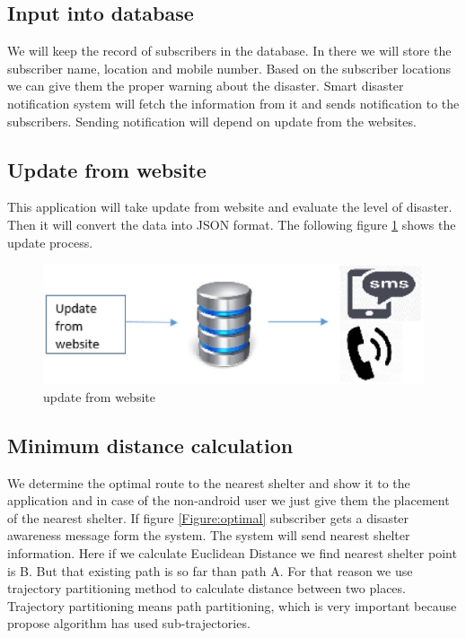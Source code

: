 \documentclass[conference]{IEEEtran}
\begin{document}
\subsection{Input into database}

We will keep the record of subscribers in the database. In there we will store the subscriber name, location and mobile number. Based on the subscriber locations we can give them the proper warning about the disaster. Smart disaster notification system will fetch the information from it and sends notification to the subscribers. Sending notification will depend on update from the websites.



\subsection{Update from website}
This application will take update from website and evaluate the level of disaster. Then it will convert the data into JSON format. The following figure \ref{Figure:update} shows the update process.

\begin{figure}[htp]
	\centering
		\includegraphics[width=.45\textwidth]{fig/updatefrm.eps}
	\caption{ update from website }
	\label{Figure:update}
\end{figure}


\subsection{Minimum distance calculation}
We determine the optimal route to the nearest shelter and show it to the application and in case of the non-android user we just give them the placement of the nearest shelter. If figure \ref{Figure:optimal} subscriber gets a disaster awareness message form the system. The system will send nearest shelter information. Here if we calculate Euclidean Distance \cite{krislock2012euclidean} we find nearest shelter point is B. But that existing path is so far than path A. For that reason we use trajectory partitioning method\cite{lee2007trajectory} to calculate distance between two places. Trajectory partitioning means path partitioning, which is very important because propose algorithm has used sub-trajectories. 
\end{document}
